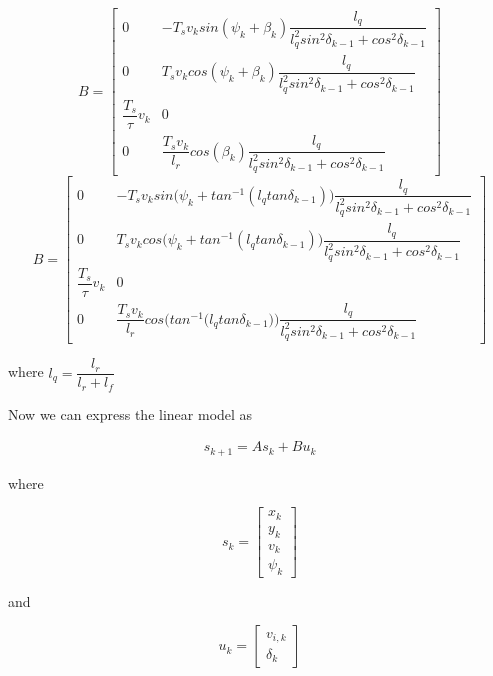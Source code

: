 \begin{equation}
 B =
  \begin{bmatrix}
    0 & -T_s v_k sin(\psi_k + \beta_k) \dfrac{l_q}{l_q^2 sin^2\delta_{k-1} + cos^2\delta_{k-1}} \\
    0 & T_s v_k cos(\psi_k + \beta_k) \dfrac{l_q}{l_q^2 sin^2\delta_{k-1} + cos^2\delta_{k-1}} \\
    \dfrac{T_s}{\tau} v_k & 0 \\
    0 & \dfrac{T_s v_k}{l_r} cos(\beta_k) \dfrac{l_q}{l_q^2 sin^2\delta_{k-1} + cos^2\delta_{k-1}}
  \end{bmatrix}
\end{equation}
\begin{equation}
  B =
  \begin{bmatrix}
    0 & -T_s v_k sin\Big(\psi_k + tan^{-1} (l_q tan\delta_{k-1})\Big) \dfrac{l_q}{l_q^2 sin^2\delta_{k-1} + cos^2\delta_{k-1}} \\
    0 & T_s v_k cos\Big(\psi_k + tan^{-1} (l_q tan\delta_{k-1})\Big) \dfrac{l_q}{l_q^2 sin^2\delta_{k-1} + cos^2\delta_{k-1}} \\
    \dfrac{T_s}{\tau} v_k & 0 \\
    0 & \dfrac{T_s v_k}{l_r} cos\Bigg(tan^{-1} \Big(l_q tan\delta_{k-1}\Big)\Bigg) \dfrac{l_q}{l_q^2 sin^2\delta_{k-1} + cos^2\delta_{k-1}}
  \end{bmatrix}
\end{equation}


where $l_q = \dfrac{l_r}{l_r + l_f}$


Now we can express the linear model as

\begin{align}
  s_{k+1} = A s_k + B u_k
\end{align}

where

\begin{equation}
  s_k=
  \begin{bmatrix}
    x_{k} \\
    y_{k} \\
    v_{k} \\
    \psi_{k}
  \end{bmatrix}
\end{equation}

and

\begin{equation}
  u_k=
  \begin{bmatrix}
    v_{i,k} \\
    \delta_{k}
  \end{bmatrix}
\end{equation}



